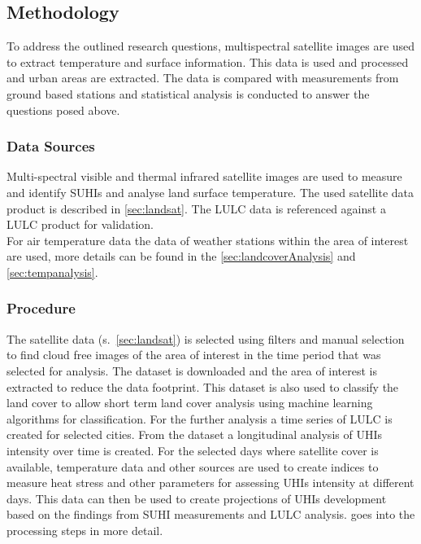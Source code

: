 \documentclass[12pt,a4paper, english,twoside]{scrartcl}
\begin{document}
 \subsection{Methodology}\label{sec:methodology}
  To address the outlined research questions, multispectral satellite images are used to extract temperature and surface information. 
  This data is used and processed and urban areas are extracted. 
  The data is compared with measurements from ground based stations and statistical analysis is conducted to answer the questions posed above.

  \subsubsection{Data Sources}\label{ssec:datasources} 
    Multi-spectral visible and thermal infrared satellite images are used to measure and identify \glspl{SUHI} and analyse land surface temperature.
    The used satellite data product is described in \cref{sec:landsat}.
    The \gls{LULC} data is referenced against a \gls{LULC} product for validation.\\ 
    For air temperature data the data of weather stations within the area of interest are used, more details can be found in the \cref{sec:landcoverAnalysis} and \cref{sec:tempanalysis}. 

  \subsubsection{Procedure}\label{ssec:procedure} 
    The satellite data (s.~\cref{sec:landsat}) is selected using filters and manual selection to find cloud free images of the area of interest in the time period that was selected for analysis. 
    The dataset is downloaded and the area of interest is extracted to reduce the data footprint.
    This dataset is also used to classify the land cover to allow short term land cover analysis using machine learning algorithms for classification.
    For the further analysis a time series of \gls{LULC} is created for selected cities. 
    From the dataset a longitudinal analysis of \glspl{UHI} intensity over time is created.
    For the selected days where satellite cover is available, temperature data and other sources are used to create indices to measure heat stress and other parameters for assessing \glspl{UHI} intensity at different days.
    This data can then be used to create projections of \glspl{UHI} development based on the findings from \gls{SUHI} measurements and \gls{LULC} analysis.
     goes into the processing steps in more detail. 
\end{document}
